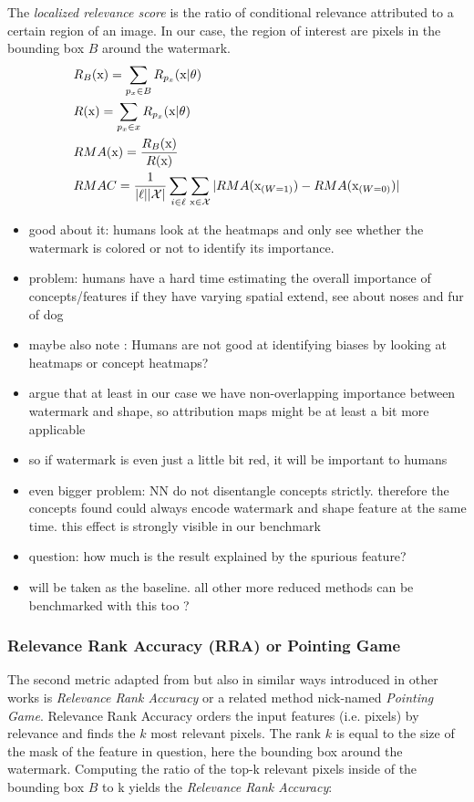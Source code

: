 The \textit{localized relevance score} is the ratio of conditional relevance attributed to a certain region of an image. In our case, the region of interest are pixels in the bounding box $B$ around the watermark. 
\begin{align*}
\displaystyle
& R_B(\mathrm{x}) = \sum_{p_x \in B} R_{p_x}(\mathrm{x} | \theta)\\
& R(\mathrm{x}) = \sum_{p_x \in x} R_{p_x}(\mathrm{x} | \theta) \\
& RMA(\mathrm{x}) = \frac{R_B(\mathrm{x})}{R(\mathrm{x})} \\
& RMAC =\frac{1}{|\ell| |\mathcal{X}|} \sum_{i \in \ell} \sum_{\mathrm{x} \in \mathcal{X}} |RMA(\mathrm{x}_{(W=1)}) - RMA(\mathrm{x}_{(W=0)})|
\end{align*}


\begin{itemize}
    \item good about it: humans look at the heatmaps and only see whether the watermark is colored or not to identify its importance.
    \item problem: humans have a hard time estimating the overall importance of concepts/features if they have varying spatial extend, see \cite{Achtibat2022} about noses and fur of dog
    \item maybe also note \cite{Sixt2022a}: Humans are not good at identifying biases by looking at heatmaps or concept heatmaps?
    \item argue that at least in our case we have non-overlapping importance between watermark and shape, so attribution maps might be at least a bit more applicable 
    \item so if watermark is even just a little bit red, it will be important to humans
    \item even bigger problem: NN do not disentangle concepts strictly. therefore the concepts found could always encode watermark and shape feature at the same time. this effect is strongly visible in our benchmark
    \item question: how much is the result explained by the spurious feature?
    \item will be taken as the baseline. all other more reduced methods can be benchmarked with this too ? 
\end{itemize}

\subsubsection{Relevance Rank Accuracy (RRA) or Pointing Game}
The second metric adapted from \cite{Arras2022} but also in similar ways introduced in other works is \textit{Relevance Rank Accuracy} or a related method nick-named \textit{Pointing Game}.  
Relevance Rank Accuracy orders the input features (i.e. pixels) by relevance and finds the $k$ most relevant pixels. The rank $k$ is equal to the size of the mask of the feature in question, here the bounding box around the watermark. Computing the ratio of the top-k relevant pixels inside of the bounding box $B$ to k yields the \textit{Relevance Rank Accuracy}:

